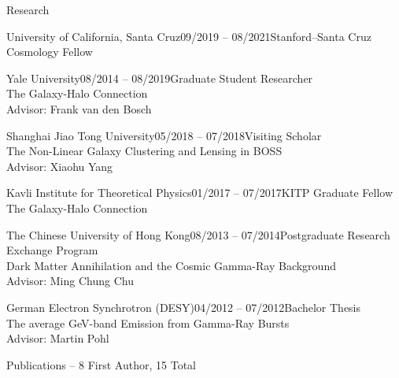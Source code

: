 \documentclass[11pt]{resume} %
\begin{document}
\begin{rSection}{Research}
  \begin{adjustwidth}{0.5cm}{}
    \begin{rSubsection}{University of California, Santa Cruz}{09/2019 -- 08/2021}{Stanford--Santa Cruz Cosmology Fellow}{}\end{rSubsection}
    \begin{rSubsection}{Yale University}{08/2014 -- 08/2019}{Graduate Student Researcher\\The Galaxy-Halo Connection\\Advisor: Frank van den Bosch}{}\end{rSubsection}
    \begin{rSubsection}{Shanghai Jiao Tong University}{05/2018 -- 07/2018}{Visiting Scholar\\The Non-Linear Galaxy Clustering and Lensing in BOSS\\Advisor: Xiaohu Yang}{}\end{rSubsection}
    \begin{rSubsection}{Kavli Institute for Theoretical Physics}{01/2017 -- 07/2017}{KITP Graduate Fellow\\The Galaxy-Halo Connection}{}\end{rSubsection}
    \begin{rSubsection}{The Chinese University of Hong Kong}{08/2013 -- 07/2014}{Postgraduate Research Exchange Program\\Dark Matter Annihilation and the Cosmic Gamma-Ray Background\\Advisor: Ming Chung Chu}{}\end{rSubsection}
    \begin{rSubsection}{German Electron Synchrotron (DESY)}{04/2012 -- 07/2012}{Bachelor Thesis\\The average GeV-band Emission from Gamma-Ray Bursts\\Advisor: Martin Pohl}{}\end{rSubsection}
  \end{adjustwidth}
\end{rSection}

\begin{rSection}{Publications -- 8 First Author, 15 Total}
  \setlength{\leftskip}{0.5cm}
  \nocite{15, 14, 13, 12, 11, 10, 9, 8, 7, 6, 5, 4, 3, 2, 1}
  \printbibliography[heading=none]
\end{rSection}
\end{document}
